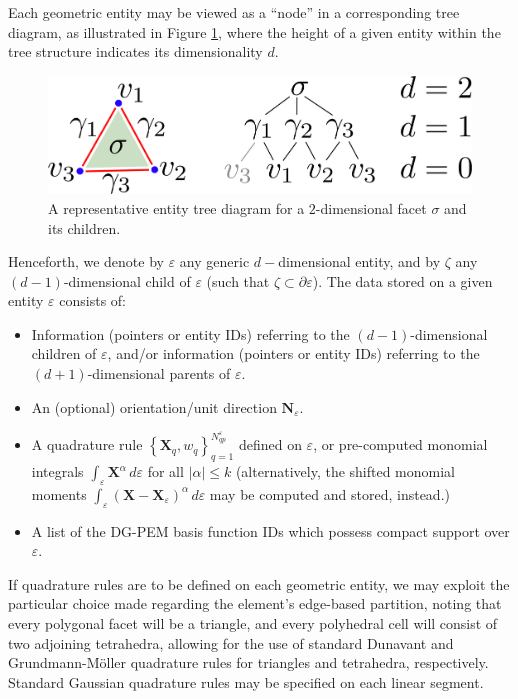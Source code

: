 	Each geometric entity may be viewed as a ``node'' in a corresponding tree diagram, as illustrated in Figure \ref{fig:entity_tree}, where the height of a given entity within the tree structure indicates its dimensionality $d$.
	\begin{figure} [!ht]
		\centering
		\includegraphics[width = 5.0in]{figures/entity_tree.pdf}
		\caption{A representative entity tree diagram for a $2$-dimensional facet $\sigma$ and its children.}
		\label{fig:entity_tree}
	\end{figure}
	
	Henceforth, we denote by $\varepsilon$ any generic $d-$dimensional entity, and by $\zeta$ any $(d-1)$-dimensional child of $\varepsilon$ (such that $\zeta \subset \partial \varepsilon$). The data stored on a given entity $\varepsilon$ consists of:
	\begin{itemize}
		\item Information (pointers or entity IDs) referring to the $(d-1)$-dimensional children of $\varepsilon$, and/or information (pointers or entity IDs) referring to the $(d+1)$-dimensional parents of $\varepsilon$.
		\item An (optional) orientation/unit direction $\mathbf{N}_\varepsilon$.
		\item A quadrature rule $\left\{ \mathbf{X}_q, w_q \right\}_{q=1}^{N^{\varepsilon}_{qp}}$ defined on $\varepsilon$, or pre-computed monomial integrals $\int_{\varepsilon} \mathbf{X}^\alpha \, d \varepsilon$ for all $|\alpha| \leq k$ (alternatively, the shifted monomial moments $\int_{\varepsilon} (\mathbf{X}-\mathbf{X}_{\varepsilon})^\alpha \, d \varepsilon$ may be computed and stored, instead.)
		\item A list of the DG-PEM basis function IDs which possess compact support over $\varepsilon$.
	\end{itemize}
	
	If quadrature rules are to be defined on each geometric entity, we may exploit the particular choice made regarding the element's edge-based partition, noting that every polygonal facet will be a triangle, and every polyhedral cell will consist of two adjoining tetrahedra, allowing for the use of standard Dunavant \cite{Dunavant:85} and Grundmann-M\"{o}ller \cite{Grundmann:78} quadrature rules for triangles and tetrahedra, respectively. Standard Gaussian quadrature rules may be specified on each linear segment.
	
